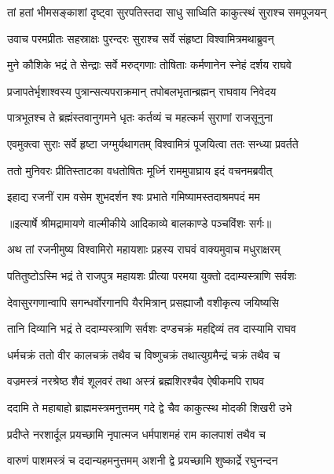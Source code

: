 \twolineshloka
{तां हतां भीमसङ्काशां दृष्ट्वा सुरपतिस्तदा}
{साधु साध्विति काकुत्स्थं सुराश्च समपूजयन्} %

\twolineshloka
{उवाच परमप्रीतः सहस्राक्षः पुरन्दरः}
{सुराश्च सर्वे संहृष्टा विश्वामित्रमथाब्रुवन्} %

\twolineshloka
{मुने कौशिके भद्रं ते सेन्द्राः सर्वे मरुद्गणाः}
{तोषिताः कर्मणानेन स्नेहं दर्शय राघवे} %

\twolineshloka
{प्रजापतेर्भृशाश्वस्य पुत्रान्सत्यपराक्रमान्}
{तपोबलभृतान्ब्रह्मन् राघवाय निवेदय} %

\twolineshloka
{पात्रभूतश्च ते ब्रह्मंस्तवानुगमने धृतः}
{कर्तव्यं च महत्कर्म सुराणां राजसूनुना} %

\twolineshloka
{एवमुक्त्वा सुराः सर्वे हृष्टा जग्मुर्यथागतम्}
{विश्वामित्रं पूजयित्वा ततः सन्ध्या प्रवर्तते} %

\twolineshloka
{ततो मुनिवरः प्रीतिस्ताटका वधतोषितः}
{मूर्ध्नि राममुपाघ्राय इदं वचनमब्रवीत्} %

\twolineshloka
{इहाद्य रजनीं राम वसेम शुभदर्शन}
{श्वः प्रभाते गमिष्यामस्तदाश्रमपदं मम} %


{॥इत्यार्षे श्रीमद्रामायणे वाल्मीकीये आदिकाव्ये बालकाण्डे पञ्चविंशः सर्गः॥}


\twolineshloka
{अथ तां रजनीमुष्य विश्वामिरो महायशाः}
{प्रहस्य राघवं वाक्यमुवाच मधुराक्षरम्} %

\twolineshloka
{पतितुष्टोऽस्मि भद्रं ते राजपुत्र महायशः}
{प्रीत्या परमया युक्तो ददाम्यस्त्राणि सर्वशः} %

\twolineshloka
{देवासुरगणान्वापि सगन्धर्वोरगानपि}
{यैरमित्रान् प्रसह्याजौ वशीकृत्य जयिष्यसि} %

\twolineshloka
{तानि दिव्यानि भद्रं ते ददाम्यस्त्राणि सर्वशः}
{दण्डचक्रं महद्दिव्यं तव दास्यामि राघव} %

\twolineshloka
{धर्मचक्रं ततो वीर कालचक्रं तथैव च}
{विष्णुचक्रं तथात्युग्रमैन्द्रं चक्रं तथैव च} %

\twolineshloka
{वज्रमस्त्रं नरश्रेष्ठ शैवं शूलवरं तथा}
{अस्त्रं ब्रह्मशिरश्चैव ऐषीकमपि राघव} %

\twolineshloka
{ददामि ते महाबाहो ब्राह्ममस्त्रमनुत्तमम्}
{गदे द्वे चैव काकुत्स्थ मोदकी शिखरी उभे} %

\twolineshloka
{प्रदीप्ते नरशार्दूल प्रयच्छामि नृपात्मज}
{धर्मपाशमहं राम कालपाशं तथैव च} %

\twolineshloka
{वारुणं पाशमस्त्रं च ददान्यहमनुत्तमम्}
{अशनी द्वे प्रयच्छामि शुष्कार्द्रे रघुनन्दन} %

